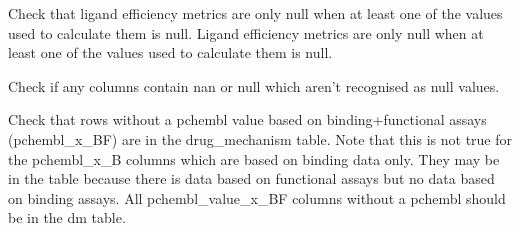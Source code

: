 \documentclass[letterpaper,10pt,english]{sphinxmanual}
\begin{document}

\begin{fulllineitems}
\label{\detokenize{sanity_checks:sanity_checks.check_ligand_efficiency_metrics}}
\pysigstartsignatures
{}
\pysigstopsignatures
\sphinxAtStartPar
Check that ligand efficiency metrics are only null
when at least one of the values used to calculate them is null.
Ligand efficiency metrics are only null when at least one of the values used to calculate them is null.

\end{fulllineitems}


\begin{fulllineitems}
\label{\detokenize{sanity_checks:sanity_checks.check_null_values}}
\pysigstartsignatures
{}
\pysigstopsignatures
\sphinxAtStartPar
Check if any columns contain nan or null which aren’t recognised as null values.

\end{fulllineitems}


\begin{fulllineitems}
\label{\detokenize{sanity_checks:sanity_checks.check_pairs_without_pchembl_are_in_drug_mechanisms}}
\pysigstartsignatures
{}
\pysigstopsignatures
\sphinxAtStartPar
Check that rows without a pchembl value based on binding+functional assays (pchembl\_x\_BF) are in the drug\_mechanism table.
Note that this is not true for the pchembl\_x\_B columns which are based on binding data only.
They may be in the table because there is data based on functional assays but no data based on binding assays.
All pchembl\_value\_x\_BF columns without a pchembl should be in the dm table.

\end{fulllineitems}
\end{document}
